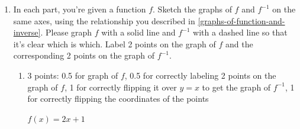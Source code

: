 \documentclass{article}
\begin{document}
\begin{enumerate}
\begin{enumerate}
    \begin{solution}
      The graph of $y=f^{-1}(x)$ is a reflection across the line $y=x$ of the graph of
      $y=f(x)$.
    \end{solution}

  \item \label{based-on-gottlieb-12.1.3}

    In each part, you're given a function $f$. Sketch the graphs of $f$ and $f^{-1}$ on the same axes, using the relationship you described in \ref{graphs-of-function-and-inverse}. Please graph $f$ with a solid line and $f^{-1}$ with a dashed line so that it's clear which is which. Label 2 points on the graph of $f$ and the corresponding 2 points on the graph of $f^{-1}$.

    \begin{enumerate}
    \item

      \begin{grading}
        3 points: 0.5 for graph of $f$, 0.5 for correctly labeling 2
        points on the graph of $f$, 1 for correctly flipping it over
        $y = x$ to get the graph of $f^{-1}$, 1 for correctly flipping
        the coordinates of the points
      \end{grading}

      \begin{problem}[\vfill]
        $f(x) = 2x + 1$
      \end{problem}

      \begin{solution}
        \begin{center}
        \end{center}
      \end{solution}


\end{enumerate}
\end{enumerate}
\end{enumerate}
\end{document}
